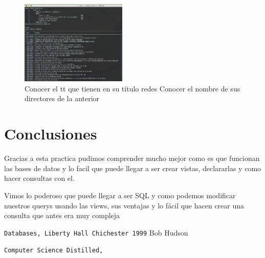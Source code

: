 \documentclass[12pt, fleqn]{article}                             %
\begin{document}
        \begin{figure}[ht!]
            \centering
            \includegraphics[width=0.45\textwidth]{BD6Reporte10}
            \caption{Conocer el tt que tienen en su título redes Conocer el nombre de sus
            directores de la anterior}
        \end{figure}







\clearpage
\section{Conclusiones}

    Gracias a esta practica pudimos comprender mucho mejor como es que funcionan las bases de datos
    y lo facil que puede llegar a ser crear vistas, declararlas y como hacer consultas con el.

    Vimos lo poderoso que puede llegar a ser SQL y como podemos modificar nuestros querys usando las 
    views, sus ventajas y lo fácil que hacen crear una consulta que antes era muy compleja




\begin{thebibliography}{9}

        \texttt{Databases, Liberty Hall Chichester 1999}
        Bob Hudson

        \texttt{Computer Science Distilled,}


     

\end{thebibliography}
\end{document}
